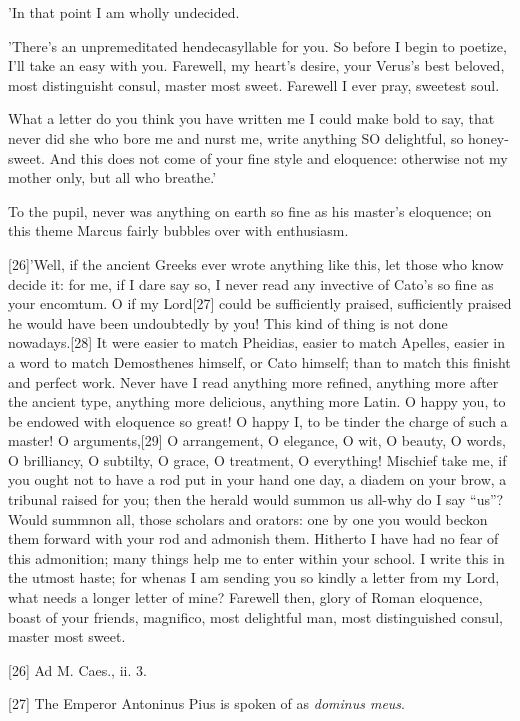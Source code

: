 'In that point I am wholly undecided.

'There's an unpremeditated hendecasyllable for you. So before I begin to
poetize, I'll take an easy with you. Farewell, my heart's desire, your
Verus's best beloved, most distinguisht consul, master most sweet.
Farewell I ever pray, sweetest soul.

What a letter do you think you have written me I could make bold to say,
that never did she who bore me and nurst me, write anything SO delightful,
so honey-sweet. And this does not come of your fine style and eloquence:
otherwise not my mother only, but all who breathe.'

To the pupil, never was anything on earth so fine as his master's
eloquence; on this theme Marcus fairly bubbles over with enthusiasm.

[26]'Well,
if the ancient Greeks ever wrote anything like this, let those who know
decide it: for me, if I dare say so, I never read any invective of Cato's
so fine as your encomtum. O if my
Lord[27]
could be sufficiently praised, sufficiently praised he would have been
undoubtedly by you! This kind of thing is not done nowadays.[28]
It were easier to match Pheidias, easier to match Apelles, easier in a
word to match Demosthenes himself, or Cato himself; than to match this
finisht and perfect work. Never have I read anything more refined,
anything more after the ancient type, anything more delicious, anything
more Latin. O happy you, to be endowed with eloquence so great! O happy
I, to be tinder the charge of such a master! O
arguments,[29]
O arrangement, O elegance, O wit, O beauty, O words, O brilliancy, O
subtilty, O grace, O treatment, O everything! Mischief take me, if you
ought not to have a rod put in your hand one day, a diadem on your brow,
a tribunal raised for you; then the herald would summon us all-why do I
say ``us''? Would summnon all, those scholars and orators: one by one you
would beckon them forward with your rod and admonish them. Hitherto I
have had no fear of this admonition; many things help me to enter within
your school. I write this in the utmost haste; for whenas I am sending
you so kindly a letter from my Lord, what needs a longer letter of mine?
Farewell then, glory of Roman eloquence, boast of your friends,
magnifico, most delightful man, most distinguished consul, master most
sweet.

[26]
Ad M. Caes., ii. 3.

[27]
The Emperor Antoninus Pius is spoken of as \emph{dominus meus}.

